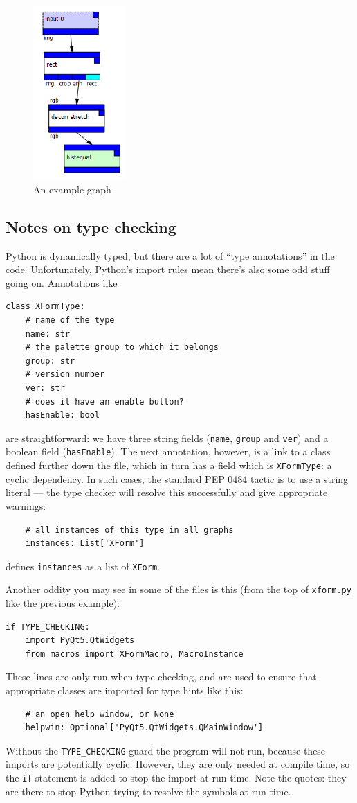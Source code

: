 \begin{figure}[ht]
\center
\includegraphics[width=1.4in]{graph.png}
\caption{An example graph}
\label{graph.png}
\end{figure}


\subsection{Notes on type checking}
Python is dynamically typed, but there are a lot of ``type annotations''
in the code. Unfortunately, Python's import rules mean there's also some
odd stuff going on. Annotations like
\begin{lstlisting}
class XFormType:
    # name of the type
    name: str
    # the palette group to which it belongs
    group: str
    # version number
    ver: str
    # does it have an enable button?
    hasEnable: bool
\end{lstlisting}
are straightforward: we have three
string fields (\texttt{name}, \texttt{group} and \texttt{ver}) and
a boolean field (\texttt{hasEnable}). The next annotation, however,
is a link to a class defined further down the file, which in turn has
a field which is \texttt{XFormType}: a cyclic dependency. In such cases,
the standard PEP 0484 tactic is to use a string literal --- the type
checker will resolve this successfully and give appropriate warnings:
\begin{lstlisting}
    # all instances of this type in all graphs
    instances: List['XForm']
\end{lstlisting}
defines \texttt{instances} as a list of \texttt{XForm}.

Another oddity you may see in some of the files is this (from the top
of \texttt{xform.py} like the previous example):
\begin{lstlisting}
if TYPE_CHECKING:
    import PyQt5.QtWidgets
    from macros import XFormMacro, MacroInstance
\end{lstlisting}
These lines are only run when type checking, and are used to ensure
that appropriate classes are imported for type hints like this:
\begin{lstlisting}
    # an open help window, or None
    helpwin: Optional['PyQt5.QtWidgets.QMainWindow']
\end{lstlisting}
Without the \texttt{TYPE\_CHECKING} guard the program will not run, because
these imports are potentially cyclic. However, they are only needed at 
compile time, so the \texttt{if}-statement is added to stop the import
at run time. Note the quotes: they are there to stop Python trying to
resolve the symbols at run time.

